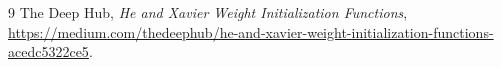 \documentclass[11pt,a4paper]{article}
\begin{document}

\begin{thebibliography}{9}
The Deep Hub, \emph{He and Xavier Weight Initialization Functions},
\url{https://medium.com/thedeephub/he-and-xavier-weight-initialization-functions-acedc5322ce5}.
\end{thebibliography}
\end{document}
